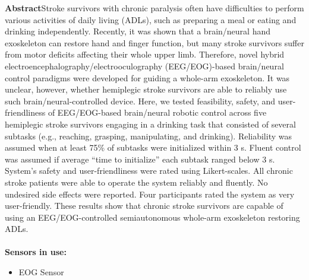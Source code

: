 \noindent
\textbf{Abstract}Stroke survivors with chronic paralysis often have difficulties to perform various activities of daily living (ADLs), such as preparing a meal or eating and drinking independently. Recently, it was shown that a brain/neural hand exoskeleton can restore hand and finger function, but many stroke survivors suffer from motor deficits affecting their whole upper limb. Therefore, novel hybrid electroencephalography/electrooculography (EEG/EOG)-based brain/neural control paradigms were developed for guiding a whole-arm exoskeleton. It was unclear, however, whether hemiplegic stroke survivors are able to reliably use such brain/neural-controlled device. Here, we tested feasibility, safety, and user-friendliness of EEG/EOG-based brain/neural robotic control across five hemiplegic stroke survivors engaging in a drinking task that consisted of several subtasks (e.g., reaching, grasping, manipulating, and drinking). Reliability was assumed when at least 75\% of subtasks were initialized within 3 s. Fluent control was assumed if average “time to initialize” each subtask ranged below 3 s. System's safety and user-friendliness were rated using Likert-scales. All chronic stroke patients were able to operate the system reliably and fluently. No undesired side effects were reported. Four participants rated the system as very user-friendly. These results show that chronic stroke survivors are capable of using an EEG/EOG-controlled semiautonomous whole-arm exoskeleton restoring ADLs.
\\ \\


\noindent
\textbf{Sensors in use:}
\begin{itemize}
    \item EOG Sensor \\ \\
\end{itemize}
